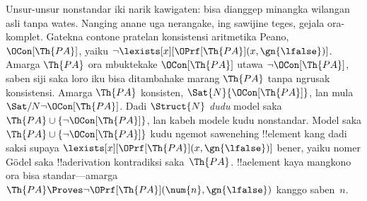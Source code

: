 \documentclass[../../../include/open-logic-section]{subfiles}
\begin{document}
Unsur-unsur nonstandar iki
narik kawigaten: bisa dianggep
minangka wilangan asli
tanpa wates. Nanging
anane uga nerangake,
ing sawijine teges,
gejala ora-komplet.
Gatekna contone pratelan
konsistensi aritmetika Peano,
$\OCon[\Th{PA}]$, yaiku
$\lnot
\lexists[x][\OPrf[\Th{PA}](x, \gn{\lfalse})]$.
Amarga $\Th{PA}$ ora
mbuktekake $\OCon[\Th{PA}]$
utawa $\lnot \OCon[\Th{PA}]$,
saben siji saka loro iku
bisa ditambahake marang
$\Th{PA}$ tanpa
ngrusak konsistensi.
Amarga $\Th{PA}$
konsisten,
$\Sat{N}{\OCon[\Th{PA}]}$,
lan mula
$\Sat/{N}{\lnot
  \OCon[\Th{PA}]}$.
Dadi $\Struct{N}$
\emph{dudu} model saka
$\Th{PA}
\cup \{\lnot \OCon[\Th{PA}]\}$,
lan kabeh modele
kudu nonstandar.
Model saka
$\Th{PA} \cup
\{\lnot \OCon[\Th{PA}]\}$
kudu ngemot sawenehing
!!{element} kang dadi
saksi supaya
$\lexists[x][\OPrf[\Th{PA}](x, \gn{\lfalse})]$
bener, yaiku nomer
G\"odel saka !!a{derivation}
kontradiksi saka~$\Th{PA}$.
!!a{element} kaya mangkono
ora bisa standar---amarga
$\Th{PA} \Proves \lnot
\OPrf[\Th{PA}](\num{n}, \gn{\lfalse})$
kanggo saben~$n$.
\end{document}
